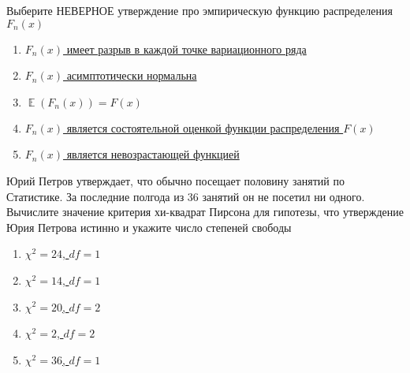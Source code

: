 \documentclass[t]{beamer}
\DeclareMathOperator{\E}{\mathbb{E}}
\begin{document}
 \begin{frame} \label{22} 
\begin{block}{22} 

 Выберите НЕВЕРНОЕ утверждение про эмпирическую функцию распределения $F_n(x)$

 \end{block} 
\begin{enumerate} 
\item[] \hyperlink{22-No}{\beamergotobutton{} $F_n(x)$ имеет разрыв в каждой точке вариационного ряда}
\item[] \hyperlink{22-No}{\beamergotobutton{} $F_n(x)$ асимптотически нормальна}
\item[] \hyperlink{22-No}{\beamergotobutton{} $\E(F_n(x))=F(x)$}
\item[] \hyperlink{22-No}{\beamergotobutton{} $F_n(x)$ является состоятельной оценкой функции распределения $F(x)$}
\item[] \hyperlink{22-Yes}{\beamergotobutton{} $F_n(x)$ является невозрастающей функцией}
\end{enumerate} 
\end{frame} 


 \begin{frame} \label{23} 
\begin{block}{23} 

 Юрий Петров утверждает, что обычно посещает половину занятий по Статистике. За последние полгода из 36 занятий он не посетил ни одного. Вычислите значение критерия хи-квадрат Пирсона для гипотезы, что утверждение Юрия Петрова истинно и укажите число степеней свободы
  


 \end{block} 
\begin{enumerate} 
\item[] \hyperlink{23-No}{\beamergotobutton{} $\chi^2 = 24$, $df=1$}
\item[] \hyperlink{23-No}{\beamergotobutton{} $\chi^2 = 14$, $df=1$}
\item[] \hyperlink{23-No}{\beamergotobutton{} $\chi^2 = 20$, $df=2$}
\item[] \hyperlink{23-No}{\beamergotobutton{} $\chi^2 = 2$, $df=2$}
\item[] \hyperlink{23-Yes}{\beamergotobutton{} $\chi^2 = 36$, $df=1$}
\end{enumerate} 
\end{frame} 
\end{document}
